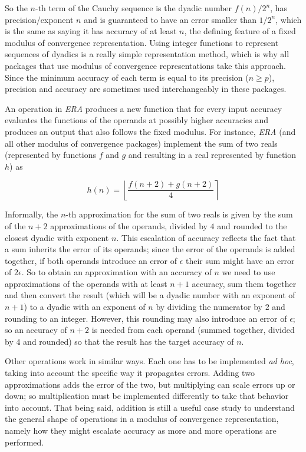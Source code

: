 So the $n$-th term of the Cauchy sequence is the dyadic number $f(n)/2^n$, has precision/exponent $n$ and is guaranteed to have an error smaller than $1/2^n$, which is the same as saying it has accuracy of at least $n$, the defining feature of a fixed modulus of convergence representation. Using integer functions to represent sequences of dyadics is a really simple representation method, which is why all packages that use modulus of convergence representations take this approach. Since the minimum accuracy of each term is equal to its precision ($n \geq p$), precision and accuracy are sometimes used interchangeably in these packages.

An operation in \textit{ERA} produces a new function that for every input accuracy evaluates the functions of the operands at possibly higher accuracies and produces an output that also follows the fixed modulus. For instance, \textit{ERA} (and all other modulus of convergence packages) implement the sum of two reals (represented by functions $f$ and $g$ and resulting in a real represented by function $h$) as

\begin{equation*}
  h(n) = \left\lfloor \frac{f(n + 2) + g(n + 2)}{4} \right\rceil
\end{equation*}

Informally, the $n$-th approximation for the sum of two reals is given by the sum of the $n+2$ approximations of the operands, divided by $4$ and rounded to the closest dyadic with exponent $n$. This escalation of accuracy reflects the fact that a sum inherits the error of its operands; since the error of the operands is added together, if both operands introduce an error of $\epsilon$ their sum might have an error of $2\epsilon$. So to obtain an approximation with an accuracy of $n$ we need to use approximations of the operands with at least $n+1$ accuracy, sum them together and then convert the result (which will be a dyadic number with an exponent of $n+1$) to a dyadic with an exponent of $n$ by dividing the numerator by $2$ and rounding to an integer. However, this rounding may also introduce an error of $\epsilon$; so an accuracy of $n+2$ is needed from each operand (summed together, divided by $4$ and rounded) so that the result has the target accuracy of $n$.

Other operations work in similar ways. Each one has to be implemented \textit{ad hoc}, taking into account the specific way it propagates errors. Adding two approximations adds the error of the two, but multiplying can scale errors up or down; so multiplication must be implemented differently to take that behavior into account. That being said, addition is still a useful case study to understand the general shape of operations in a modulus of convergence representation, namely how they might escalate accuracy as more and more operations are performed.

